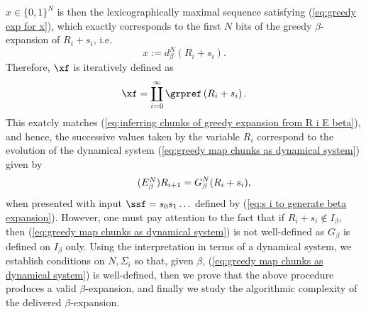 $x \in \{0,1\}^N$ is then the lexicographically maximal sequence satisfying (\ref{eq:greedy exp for x}), which exactly corresponds to the first $N$ bits of the greedy $\beta$-expansion of $R_i+s_i$, i.e.
\begin{equation}
	x := d_\beta^N(R_i + s_i).
\end{equation}
Therefore, $\xf$ is iteratively defined as 
\begin{equation}
	\xf = \coprod_{i=0}^\infty \grpref\left(R_i + s_i\right).
\end{equation}
This exatcly matches (\ref{eq:inferring chunks of greedy expansion from R i E beta}), and
hence, the successive values taken by the variable $R_i$ correspond to the evolution of the dynamical system (\ref{eq:greedy map chunks as dynamical system}) given by
\begin{equation}
	\tag{\text{$E^N_\beta$}}
	R_{i+1} = G_\beta^N(R_i + s_i),
\end{equation}
when presented with input $\ssf =s_0s_1\ldots$ defined by (\ref{eq:s i to generate beta expansion}). 
However, one must pay attention to the fact that if $R_i + s_i \notin I_\beta$, then (\ref{eq:greedy map chunks as dynamical system}) is not well-defined as $G_\beta$ is defined on $I_\beta$ only. Using the interpretation in terms of a dynamical system, we establish conditions on $N,\Sigma_i$ so that, given $\beta$, (\ref{eq:greedy map chunks as dynamical system}) is well-defined, then we prove that the above procedure produces a valid $\beta$-expansion, and finally we study the algorithmic complexity of the delivered $\beta$-expansion.









